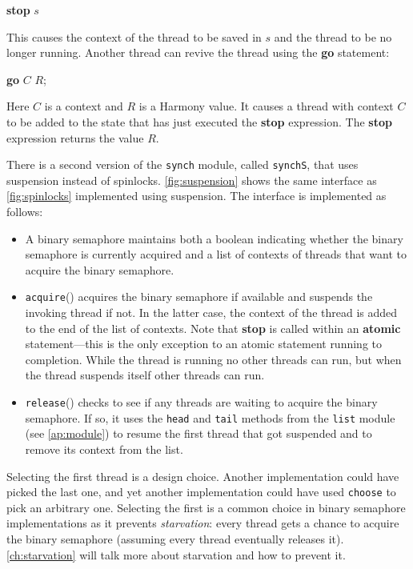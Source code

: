 \documentclass{report}
\newenvironment{code}{
\tcolorbox
}{
\endtcolorbox
}
\begin{document}
\begin{code}
\textbf{stop} $s$
\end{code}

This causes the context of the thread to be saved in $s$ and
the thread to be no longer running.
Another thread can revive the thread using the \textbf{go}
%
statement:

\begin{code}
\textbf{go} $C$ $R$;
\end{code}

Here $C$ is a context and $R$ is a Harmony value.
It causes a thread with context $C$ to be added to the state that has
just executed the \textbf{stop}
%
expression.  The \textbf{stop} expression returns the value $R$.

There is a second version of the \texttt{synch} module, called \texttt{synchS},
that uses suspension instead of spinlocks.
\autoref{fig:suspension} shows the same interface
as \autoref{fig:spinlocks} implemented using suspension.
The interface is implemented as follows:
\begin{itemize}
\item A binary semaphore maintains both a boolean indicating whether the
binary semaphore is currently acquired and a list of contexts of threads that want to
acquire the binary semaphore.
\item
\texttt{acquire}()
%
acquires the binary semaphore if available and suspends the invoking thread if not.
In the latter case, the context of the thread is added to the end of the list of contexts.
Note that \textbf{stop} is called within an \textbf{atomic} statement---this is
the only exception to an atomic statement running to completion.  While the
thread is running no other threads can run, but when the thread suspends itself
other threads can run.
\item
\texttt{release}()
%
checks to see if any threads are waiting to acquire the binary semaphore.
If so, it uses the \texttt{head} and \texttt{tail}
methods from the \texttt{list} module (see \autoref{ap:module})
to resume the first thread that got
suspended and to remove its context from the list.
\end{itemize}
Selecting the first thread is a design choice.  Another implementation could
have picked the last one, and yet another implementation could have used
\texttt{choose} to pick an arbitrary one.  Selecting the first is a common
choice in binary semaphore implementations as it prevents \emph{starvation}:
%
every thread
gets a chance to acquire the binary semaphore (assuming every thread eventually releases
it).  \autoref{ch:starvation} will talk more about starvation and how
to prevent it.
\end{document}
